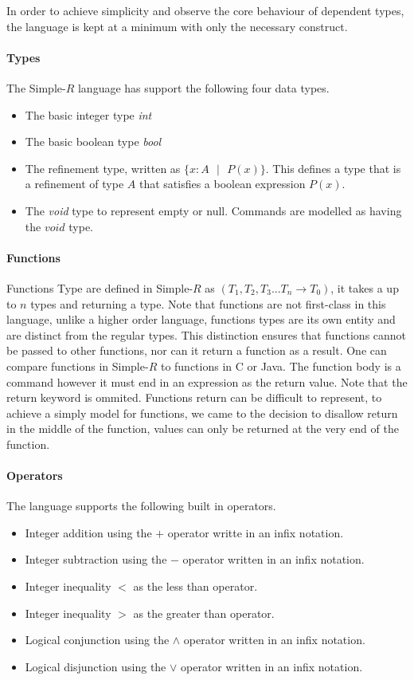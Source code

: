 \documentclass[a4paper,12pt]{report}
\begin{document}
\par
In order to achieve simplicity and observe the core behaviour of dependent 
types, the language is kept at a minimum with only the necessary construct. 

\paragraph{Types} The Simple-$R$ language has support the following four data types. 
\begin{itemize}
  \item The basic integer type \textit{int}
  \item The basic boolean type \textit{bool}
  \item The refinement type, written as $\{x: A\text{ }|\text{ }P(x)\}$. This defines 
  a type that is a refinement of type $A$ that satisfies a boolean expression $P(x)$.
  \item The \textit{void} type to represent empty or null. Commands are modelled 
  as having the $void$ type.
\end{itemize}

\paragraph{Functions}
Functions Type are defined in Simple-$R$ as $(T_1, T_2,T_3...T_n \longrightarrow T_0)$, 
it takes a up to $n$ types and returning a type. Note that functions are 
not first-class in this language, unlike a higher order 
language, functions types are its own entity and are distinct from the regular 
types. This distinction ensures that functions cannot be passed to 
other functions, nor can it return a function as a result. One can compare 
functions in Simple-$R$ to functions in C or Java. The function body is a 
command however it must end in an expression as the return value. Note that the 
return keyword is ommited. Functions return can be difficult to represent, to achieve 
a simply model for functions, we came to the decision to disallow return in the 
middle of the function, values can only be returned at the very end of the 
function.

\paragraph{Operators}
The language supports the following built in operators.
\begin{itemize}
  \item Integer addition using the $+$ operator writte in an infix notation.
  \item Integer subtraction using the $-$ operator written in an infix notation.
  \item Integer inequality $<$ as the less than operator.
  \item Integer inequality $>$ as the greater than operator.
  \item Logical conjunction using the $\wedge$ operator written in an infix 
  notation.
  \item Logical disjunction using the $\vee$ operator written in an infix 
  notation.
\end{itemize}
\end{document}
